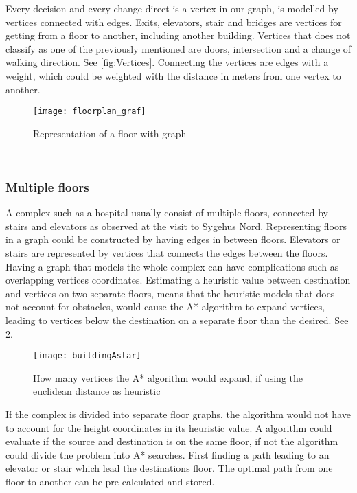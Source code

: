 Every decision and every change direct is a vertex in our graph, is modelled by vertices connected with edges. Exits, elevators, stair and bridges are vertices for getting from a floor to another, including another building. Vertices that does not classify as one of the previously mentioned are doors, intersection and a change of walking direction. See \cref{fig:Vertices}. Connecting the vertices are edges with a weight, which could be weighted with the distance in meters from one vertex to another.

\begin{figure}[ht!]
    \centering
    \texttt{[image: floorplan\_graf]}
    \caption{Representation of a floor with graph}
    \label{fig:floorplan_graf}
  \end{figure}
\

\subsubsection{Multiple floors}

A complex such as a hospital usually consist of multiple floors, connected by stairs and elevators as observed at the visit to Sygehus Nord. Representing floors in a graph could be constructed by having edges in between floors. Elevators or stairs are represented by vertices that connects the edges between the floors. Having a graph that models the whole complex can have complications such as overlapping vertices coordinates. Estimating a heuristic value between destination and vertices on two separate floors, means that the heuristic models that does not account for obstacles, would cause the A* algorithm to expand vertices, leading to vertices below the destination on a separate floor than the desired. See \cref{fig:buildingAstar}.

\begin{figure}[ht!]
    \centering
    \texttt{[image: buildingAstar]}
    \caption{How many vertices the A* algorithm would expand, if using the euclidean distance as heuristic}
    \label{fig:buildingAstar}
  \end{figure}

If the complex is divided into separate floor graphs, the algorithm would not have to account for the height coordinates in its heuristic value. A algorithm could evaluate if the source and destination is on the same floor, if not the algorithm could divide the problem into A* searches. First finding a path leading to an elevator or stair which lead the destinations floor. The optimal path from one floor to another can be pre-calculated and stored. 


